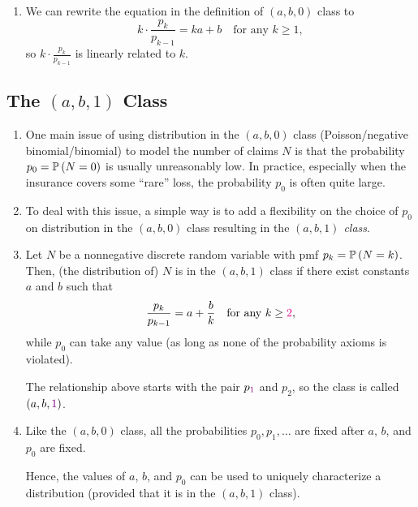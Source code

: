 \begin{enumerate}
\item We can rewrite the equation in the definition of \((a,b,0)\) class to
\[
k\cdot\frac{p_k}{p_{k-1}}=ka+b\quad\text{for any \(k\ge 1\)},
\]
so \(\displaystyle k\cdot \frac{p_k}{p_{k-1}}\) is linearly related to \(k\).

\end{enumerate}
\subsection{The \((a,b,1)\) Class}
\begin{enumerate}
\item One main issue of using distribution in the \((a,b,0)\) class
(Poisson/negative binomial/binomial) to model the number of claims \(N\) is
that the probability \(p_0=\mathbb{P}\left(N=0\right)\) is usually unreasonably low. In practice,
especially when the insurance covers some ``rare'' loss, the probability
\(p_0\) is often quite large.

\item To deal with this issue, a simple way is to add a flexibility on the
choice of \(p_0\) on distribution in the \((a,b,0)\) class 
resulting in the \emph{\((a,b,1)\) class}.

\item Let \(N\) be a nonnegative discrete random variable with pmf
\(p_k=\mathbb{P}\left(N=k\right)\). Then, (the distribution of) \(N\) is in the \((a,b,1)\)
class if there exist constants \(a\) and \(b\) such that
\[
\frac{p_k}{p_{k-1}}=a+\frac{b}{k}\quad\text{for any \(k\ge {\color{magenta}2}\)},
\]
while \(p_0\) can take any value (as long as none of the probability axioms is
violated).

\begin{note}
The relationship above starts with the pair \(p_{\color{violet} 1}\) and
\(p_2\), so the class is called \((a,b,{\color{violet}1})\).
\end{note}

\item Like the \((a,b,0)\) class, all the probabilities \(p_0,p_1,\dotsc\) are
fixed after \(a\), \(b\), and \(p_0\) are fixed.

Hence, the values of \(a\), \(b\), and \(p_0\) can be used to uniquely
characterize a distribution (provided that it is in the \((a,b,1)\) class).
\end{enumerate}
